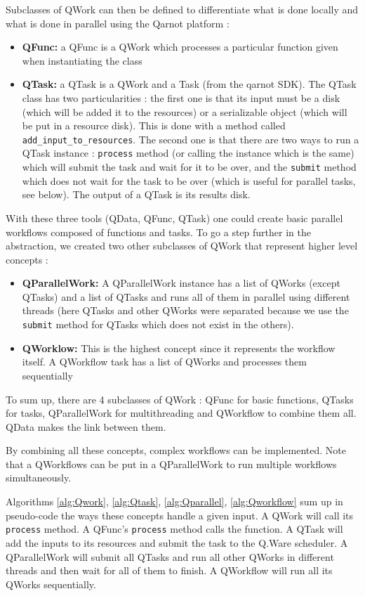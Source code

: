 \documentclass[10pt, conference, compsocconf]{IEEEtran}
\begin{document}
Subclasses of QWork can then be defined to differentiate what is done locally and what is done in parallel using the Qarnot platform : 
\begin{itemize}
\item \textbf{QFunc:} a QFunc is a QWork which processes a particular function given when instantiating the class
\item \textbf{QTask:} a QTask is a QWork and a Task (from the qarnot SDK). The QTask class has two particularities : 
the first one is that its input must be a disk (which will be added it to the resources) or a serializable object (which will be put in a resource disk). This is done with a method called \texttt{add\_input\_to\_resources}. The second one is that there are two ways to run a QTask instance : \texttt{process} method (or calling the instance which is the same) which will submit the task and wait for it to be over, and the \texttt{submit} method which does not wait for the task to be over (which is useful for parallel tasks, see below). The output of a QTask is its results disk.
\end{itemize}
With these three tools (QData, QFunc, QTask) one could create basic parallel workflows composed of functions and tasks. To go a step further in the abstraction, we created two other subclasses of QWork that represent higher level concepts : 
\begin{itemize}
\item \textbf{QParallelWork:} A QParallelWork instance has a list of QWorks (except QTasks) and a list of QTasks and runs all of them in parallel using different threads (here QTasks and other QWorks were separated because we use the \texttt{submit} method for QTasks which does not exist in the others).
\item \textbf{QWorklow:} This is the highest concept since it represents the workflow itself. A QWorkflow task has a list of QWorks and processes them sequentially
\end{itemize}
To sum up, there are 4 subclasses of QWork : QFunc for basic functions, QTasks for tasks, QParallelWork for multithreading and QWorkflow to combine them all. QData makes the link between them.

By combining all these concepts, complex workflows can be implemented. Note that a QWorkflows can be put in a QParallelWork to run multiple workflows simultaneously. 

Algorithms \ref{alg:Qwork}, \ref{alg:Qtask}, \ref{alg:Qparallel}, \ref{alg:Qworkflow} sum up in pseudo-code the ways these concepts handle a given input. A QWork will call its \texttt{process} method. A QFunc's \texttt{process} method calls the function. A QTask will add the inputs to its resources and submit the task to the Q.Ware scheduler. A QParallelWork will submit all QTasks and run all other QWorks in different threads and then wait for all of them to finish. A QWorkflow will run all its QWorks sequentially.
\end{document}
